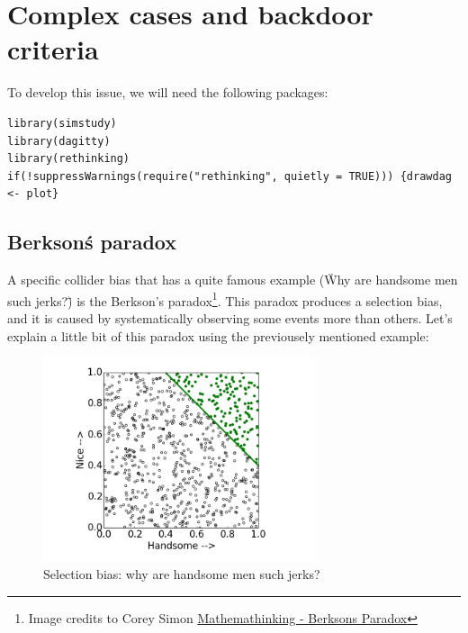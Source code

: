 \documentclass{article}
\begin{document}
\newpage

\section{Complex cases and backdoor criteria}

To develop this issue, we will need the following packages:

\begin{lstlisting}
library(simstudy)
library(dagitty)
library(rethinking)
if(!suppressWarnings(require("rethinking", quietly = TRUE))) {drawdag <- plot}
\end{lstlisting}

\subsection{Berkson\'s paradox}

A specific collider bias that has a quite famous example (\"Why are handsome men such jerks?\") is the Berkson's paradox\footnote{Image credits to Corey Simon \href{http://corysimon.github.io/articles/berksons-paradox-are-handsome-men-really-jerks/}{Mathemathinking - Berksons Paradox}}. This paradox produces a selection bias, and it is caused by systematically observing some events more than others. Let's explain a little bit of this paradox using the previousely mentioned example:

\begin{figure}[h]
\caption{Selection bias: why are handsome men such jerks?}
\includegraphics[width=8cm]{berkson_men.png}
\centering
\end{figure}
\end{document}
